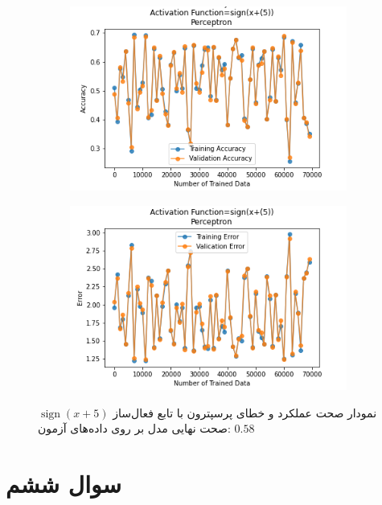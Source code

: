 \documentclass[12pt, a4paper]{article}
\DeclareMathOperator{\sign}{sign}
\begin{document}
\begin{figure}[!h]
    \begin{subfigure}{0.45\linewidth}
        \centering
        \includegraphics[width=\linewidth]{images/5/perceptron/activation_func/3.png}
    \end{subfigure}
    \hfil
    \begin{subfigure}{0.45\linewidth}
        \centering
        \includegraphics[width=\linewidth]{images/5/perceptron/activation_func/4.png}
    \end{subfigure}
    \caption{نمودار صحت عملکرد‌ و خطای پرسپترون با تابع فعال‌ساز $\sign(x+5)$
    \newline
    صحت نهایی مدل بر روی داده‌های آزمون: $0.58$}
\end{figure}

\clearpage

\section*{سوال ششم}
\end{document}
